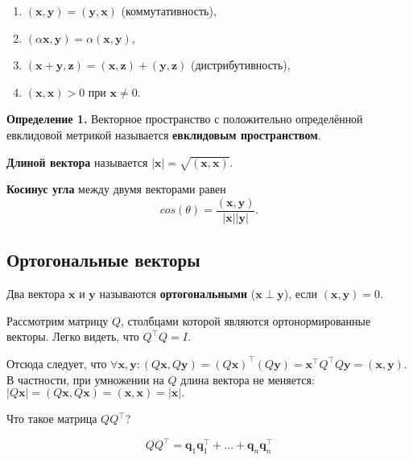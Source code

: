 \documentclass[11pt,a4paper]{article}
\providecommand{\tightlist}{%
      \setlength{\itemsep}{0pt}\setlength{\parskip}{0pt}}
\begin{document}
\begin{enumerate}
\def\labelenumi{\arabic{enumi}.}
\tightlist
\item
  \((\mathbf{x}, \mathbf{y}) = (\mathbf{y}, \mathbf{x})\)
  (коммутативность),
\item
  \((\alpha \mathbf{x}, \mathbf{y}) = \alpha (\mathbf{x}, \mathbf{y})\),
\item
  \((\mathbf{x} + \mathbf{y}, \mathbf{z}) = (\mathbf{x}, \mathbf{z}) + (\mathbf{y}, \mathbf{z})\)
  (дистрибутивность),
\item
  \((\mathbf{x}, \mathbf{x}) > 0\) при \(\mathbf{x} \ne 0\).
\end{enumerate}

\textbf{Определение 1.} Векторное пространство с положительно
определённой евклидовой метрикой называется \textbf{евклидовым
пространством}.

\textbf{Длиной вектора} называется
\(|\mathbf{x}| = \sqrt{(\mathbf{x}, \mathbf{x})}\).

\textbf{Косинус угла} между двумя векторами равен
\[ cos(\theta) = \frac{(\mathbf{x}, \mathbf{y})}{|\mathbf{x}| |\mathbf{y}|}. \]

    \hypertarget{ux43eux440ux442ux43eux433ux43eux43dux430ux43bux44cux43dux44bux435-ux432ux435ux43aux442ux43eux440ux44b}{%
\subsection{Ортогональные
векторы}\label{ux43eux440ux442ux43eux433ux43eux43dux430ux43bux44cux43dux44bux435-ux432ux435ux43aux442ux43eux440ux44b}}

Два вектора \(\mathbf{x}\) и \(\mathbf{y}\) называются
\textbf{ортогональными} (\(\mathbf{x} \perp \mathbf{y}\)), если
\((\mathbf{x}, \mathbf{y}) = 0\).

Рассмотрим матрицу \(Q\), столбцами которой являются ортонормированные
векторы. Легко видеть, что \(Q^\top Q = I\).

Отсюда следует, что
\(\forall \mathbf{x}, \mathbf{y}: (Q\mathbf{x}, Q\mathbf{y}) = (Q\mathbf{x})^\top (Q\mathbf{y}) = \mathbf{x}^\top Q^\top Q \mathbf{y} = (\mathbf{x}, \mathbf{y})\).
В частности, при умножении на \(Q\) длина вектора не меняется:
\(|Q\mathbf{x}| = (Q\mathbf{x}, Q\mathbf{x}) = (\mathbf{x}, \mathbf{x}) = |\mathbf{x}|.\)

Что такое матрица \(Q Q^\top\)?

\[
  Q Q^\top = \mathbf{q}_1 \mathbf{q}_1^\top + \ldots + \mathbf{q}_n \mathbf{q}_n^\top
\]
\end{document}
